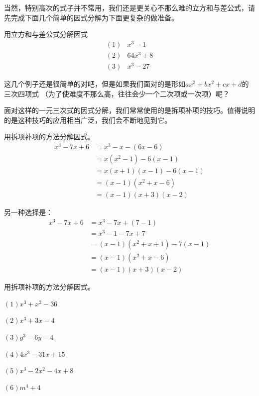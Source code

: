 当然，特别高次的式子并不常用，我们还是更关心不那么难的立方和与差公式，请先完成下面几个简单的因式分解为下面更复杂的做准备。
\begin{exercise}
    用立方和与差公式分解因式
    \begin{align*}
        (1)&x^3-1\\
        (2)&64x^3+8\\
        (3)&x^3-27
    \end{align*}
\end{exercise}

这几个例子还是很简单的对吧，但是如果我们面对的是形如$ax^3+bx^2+cx+d$的三次四项式
（为了使难度不那么高，往往会少一个二次项或一次项）呢？

面对这样的一元三次式的因式分解，我们常常使用的是拆项补项的技巧。值得说明的是这种技巧的应用相当广泛，我们会不断地见到它。

\begin{example}
用拆项补项的方法分解因式。  
\begin{align*}
    x^3-7x+6&=x^3-x-(6x-6)\\
            &=x(x^2-1)-6(x-1)\\
            &=x(x+1)(x-1)-6(x-1)\\ 
            &=(x-1)(x^2+x-6)\\  
            &=(x-1)(x+3)(x-2)
\end{align*}%

另一种选择是：
\begin{align*}
    x^3-7x+6&=x^3-7x+(7-1)\\
            &=x^3-1-7x+7\\
            &=(x-1)(x^2+x+1)-7(x-1)\\
            &=(x-1)(x^2+x-6)\\  
            &=(x-1)(x+3)(x-2)
\end{align*}
\end{example}

\begin{exercise}
    用拆项补项的方法分解因式。  


$(1)x^3+x^2-36$

$(2)x^3+3x-4$

$(3)y^3-6y-4$

$(4)4x^3-31x+15$

$(5)x^3-2x^2-4x+8$

$(6)m^4+4$
\end{exercise}

